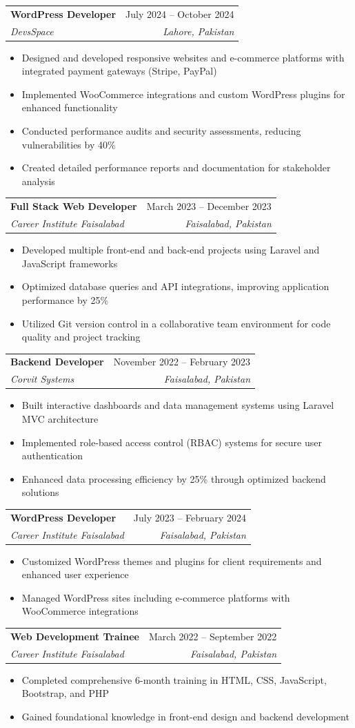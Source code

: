\documentclass[letterpaper,11pt]{article}
\makeatletter
\newcommand{\resumeItem}[1]{
  \item\small{#1 \vspace{-2pt}}
}
\newcommand{\resumeSubheading}[4]{
  \vspace{-2pt}\item
    \begin{tabular*}{0.97\textwidth}[t]{l@{\extracolsep{\fill}}r}
      \textbf{#1} & #2 \\
      \textit{\small#3} & \textit{\small #4} \\
    \end{tabular*}\vspace{-7pt}
}
\newcommand{\resumeItemListStart}{\begin{itemize}}
\newcommand{\resumeItemListEnd}{\end{itemize}\vspace{-5pt}}
\makeatother
\begin{document}
    \resumeSubheading
      {WordPress Developer}{July 2024 -- October 2024}
      {DevsSpace}{Lahore, Pakistan}
      \resumeItemListStart
        \resumeItem{Designed and developed responsive websites and e-commerce platforms with integrated payment gateways (Stripe, PayPal)}
        \resumeItem{Implemented WooCommerce integrations and custom WordPress plugins for enhanced functionality}
        \resumeItem{Conducted performance audits and security assessments, reducing vulnerabilities by 40\%}
        \resumeItem{Created detailed performance reports and documentation for stakeholder analysis}
      \resumeItemListEnd

    \resumeSubheading
      {Full Stack Web Developer}{March 2023 -- December 2023}
      {Career Institute Faisalabad}{Faisalabad, Pakistan}
      \resumeItemListStart
        \resumeItem{Developed multiple front-end and back-end projects using Laravel and JavaScript frameworks}
        \resumeItem{Optimized database queries and API integrations, improving application performance by 25\%}
        \resumeItem{Utilized Git version control in a collaborative team environment for code quality and project tracking}
      \resumeItemListEnd

    \resumeSubheading
      {Backend Developer}{November 2022 -- February 2023}
      {Corvit Systems}{Faisalabad, Pakistan}
      \resumeItemListStart
        \resumeItem{Built interactive dashboards and data management systems using Laravel MVC architecture}
        \resumeItem{Implemented role-based access control (RBAC) systems for secure user authentication}
        \resumeItem{Enhanced data processing efficiency by 25\% through optimized backend solutions}
      \resumeItemListEnd

    \resumeSubheading
      {WordPress Developer}{July 2023 -- February 2024}
      {Career Institute Faisalabad}{Faisalabad, Pakistan}
      \resumeItemListStart
        \resumeItem{Customized WordPress themes and plugins for client requirements and enhanced user experience}
        \resumeItem{Managed WordPress sites including e-commerce platforms with WooCommerce integrations}
      \resumeItemListEnd

    \resumeSubheading
      {Web Development Trainee}{March 2022 -- September 2022}
      {Career Institute Faisalabad}{Faisalabad, Pakistan}
      \resumeItemListStart
        \resumeItem{Completed comprehensive 6-month training in HTML, CSS, JavaScript, Bootstrap, and PHP}
        \resumeItem{Gained foundational knowledge in front-end design and backend development}
      \resumeItemListEnd
\end{document}
